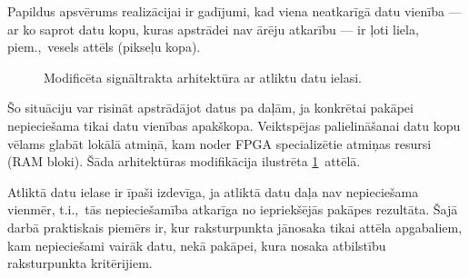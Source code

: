 Papildus apsvērums realizācijai ir gadījumi, kad viena neatkarīgā datu vienība
--- ar ko saprot datu kopu, kuras apstrādei nav ārēju atkarību --- ir
ļoti liela, piem.,~vesels attēls (pikseļu kopa).
\begin{figure}[tbh]
	\centering
	\def\svgscale{1.2}
	{}
	\caption{Modificēta signāltrakta arhitektūra ar atliktu datu ielasi.}
	\label{fig:fpga-arch2}
\end{figure}
Šo situāciju var risināt apstrādājot datus pa daļām, ja konkrētai pakāpei
nepieciešama tikai datu vienības apakškopa. Veiktspējas palielināšanai datu
kopu vēlams glabāt lokālā atmiņā, kam noder FPGA specializētie atmiņas
resursi (RAM bloki). Šāda arhitektūras modifikācija ilustrēta
\ref{fig:fpga-arch2}~attēlā.

Atliktā datu ielase ir īpaši izdevīga, ja
atliktā datu daļa nav nepieciešama vienmēr, t.i.,~tās nepieciešamība
atkarīga no iepriekšējās pakāpes rezultāta.
Šajā darbā praktiskais piemērs ir, kur raksturpunkta 
jānosaka tikai attēla apgabaliem, kam nepieciešami vairāk datu, nekā pakāpei,
kura nosaka atbilstību raksturpunkta kritērijiem.


